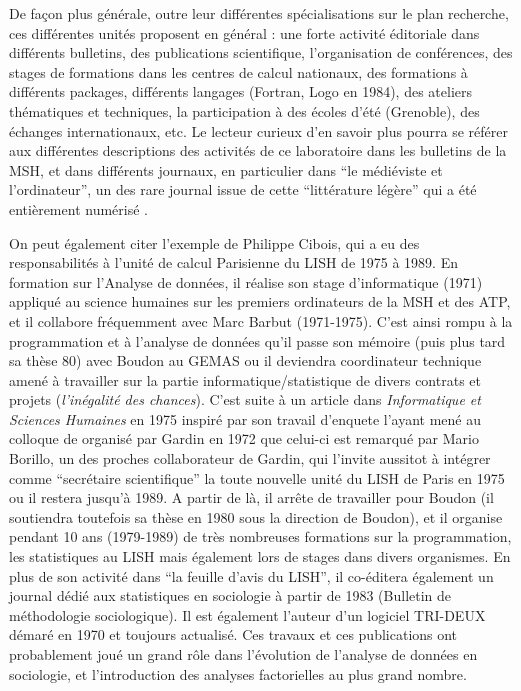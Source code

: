 De façon plus générale, outre leur différentes spécialisations sur le plan recherche, ces différentes unités proposent en général : une forte activité éditoriale dans différents bulletins, des publications scientifique, l'organisation de conférences, des stages de formations dans les centres de calcul nationaux, des formations à différents packages, différents langages (Fortran, Logo en 1984), des ateliers thématiques et techniques, la participation à des écoles d'été (Grenoble), des échanges internationaux, etc. Le lecteur curieux d'en savoir plus pourra se référer aux différentes descriptions des activités de ce laboratoire dans les bulletins de la MSH, et dans différents journaux, en particulier dans \enquote{le médiéviste et l'ordinateur}, un des rare journal issue de cette \enquote{littérature légère} qui a été entièrement numérisé .

On peut également citer l'exemple de Philippe Cibois, qui a eu des responsabilités à l'unité de calcul Parisienne du LISH de 1975 à 1989. En formation sur l’Analyse de données, il réalise son stage d’informatique (1971) appliqué au science humaines sur les premiers ordinateurs de la MSH et des ATP, et il collabore fréquemment avec Marc Barbut (1971-1975). C’est ainsi rompu à la programmation et à l’analyse de données qu’il passe son mémoire (puis plus tard sa thèse 80) avec Boudon au GEMAS ou il deviendra coordinateur technique amené à travailler sur la partie informatique/statistique de divers contrats et projets (\textit{l’inégalité des chances}). C’est suite à un article dans \textit{Informatique et Sciences Humaines} en 1975 inspiré par son travail d’enquete l’ayant mené au colloque de organisé par Gardin en 1972 que celui-ci est remarqué par Mario Borillo, un des proches collaborateur de Gardin, qui l’invite aussitot à intégrer comme \enquote{secrétaire scientifique} la toute nouvelle unité du LISH de Paris en 1975 ou il restera jusqu’à 1989. A partir de là, il arrête de travailler pour Boudon (il soutiendra toutefois sa thèse en 1980 sous la direction de Boudon), et il organise pendant 10 ans (1979-1989) de très nombreuses formations sur la programmation, les statistiques au LISH mais également lors de stages dans divers organismes. En plus de son activité dans \enquote{la feuille d’avis du LISH}, il co-éditera également un journal dédié aux statistiques en sociologie à partir de 1983 (Bulletin de méthodologie sociologique). Il est également l’auteur d’un logiciel TRI-DEUX démaré en 1970 et toujours actualisé. Ces travaux et ces publications ont probablement joué un grand rôle dans l’évolution de l’analyse de données en sociologie, et l’introduction des analyses factorielles au plus grand nombre. 


